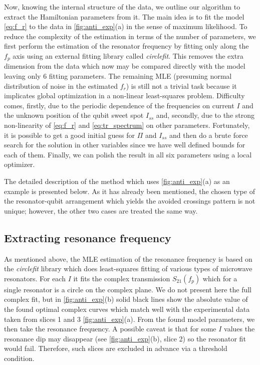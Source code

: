 \documentclass[%
 aip,
 draft,
 amsmath,amssymb,
 reprint,%
]{revtex4-1}
\begin{document}
Now, knowing the internal structure of the data, we outline our algorithm to extract the Hamiltonian parameters from it. The main idea is to fit the model \eqref{eq:f_r} to the data in \autoref{fig:anti_exp}(a) in the sense of maximum likelihood. To reduce the complexity of the estimation in terms of the number of parameters, we first perform the estimation of the resonator frequency by fitting only along the $f_p$ axis using an external fitting library called \textit{circlefit}\cite{probst2015}. This removes the extra dimension from the data which now may be compared directly with the model leaving only 6 fitting parameters. The remaining MLE (presuming normal distribution of noise in the estimated $f_r$) is still not a trivial task because it implicates global optimization in a non-linear least-squares problem. Difficulty comes, firstly, due to the periodic dependence of the frequencies on current $I$ and the unknown position of the qubit sweet spot $I_{ss}$ and, secondly, due to the strong non-linearity of \eqref{eq:f_r} and \eqref{eq:tr_spectrum} on other parameters. Fortunately, it is possible to get a good initial guess for $\Pi$ and $I_{ss}$ and then do a brute force search for the solution in other variables since we have well defined bounds for each of them. Finally, we can polish the result in all six parameters using a local optimizer.

The detailed description of the method which uses \autoref{fig:anti_exp}(a) as an example is presented below. As it has already been mentioned, the chosen type of the resonator-qubit arrangement which yields the avoided crossings pattern is not unique; however, the other two cases are treated the same way.

\subsection{Extracting resonance frequency}\label{sec:extract_fr}

As mentioned above, the MLE estimation of the resonance frequency is based on the \textit{circlefit} library which does least-squares fitting of various types of microwave resonators. For each $I$ it fits the complex transmission $S_{21}(f_p)$ which for a single resonator is a circle on the complex plane\cite{probst2015}. We do not present here the full complex fit, but in \autoref{fig:anti_exp}(b) solid black lines show the absolute value of the found optimal complex curves which match well with the experimental data taken from slices 1 and 3 \autoref{fig:anti_exp}(a). From the found model parameters, we then take the resonance frequency. A possible caveat is that for some $I$ values the resonance dip may disappear (see \autoref{fig:anti_exp}(b), slice 2) so the resonator fit would fail. Therefore, such slices are excluded in advance via a threshold condition.
\end{document}
